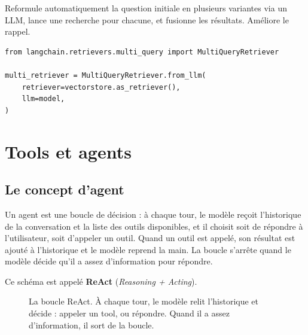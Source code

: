 \documentclass[11pt,a4paper]{article}
\begin{document}
Reformule automatiquement la question initiale en plusieurs variantes via un LLM, lance une recherche pour chacune, et fusionne les résultats. Améliore le rappel.

\begin{verbatim}
from langchain.retrievers.multi_query import MultiQueryRetriever

multi_retriever = MultiQueryRetriever.from_llm(
    retriever=vectorstore.as_retriever(),
    llm=model,
)
\end{verbatim}

\section{Tools et agents}

\subsection{Le concept d'agent}

Un agent est une boucle de décision : à chaque tour, le modèle reçoit l'historique de la conversation et la liste des outils disponibles, et il choisit soit de répondre à l'utilisateur, soit d'appeler un outil. Quand un outil est appelé, son résultat est ajouté à l'historique et le modèle reprend la main. La boucle s'arrête quand le modèle décide qu'il a assez d'information pour répondre.

Ce schéma est appelé \textbf{ReAct} (\emph{Reasoning + Acting}).

\begin{figure}[h]
\centering
{}
\caption{La boucle ReAct. À chaque tour, le modèle relit l'historique et décide : appeler un tool, ou répondre. Quand il a assez d'information, il sort de la boucle.}
\end{figure}
\end{document}
